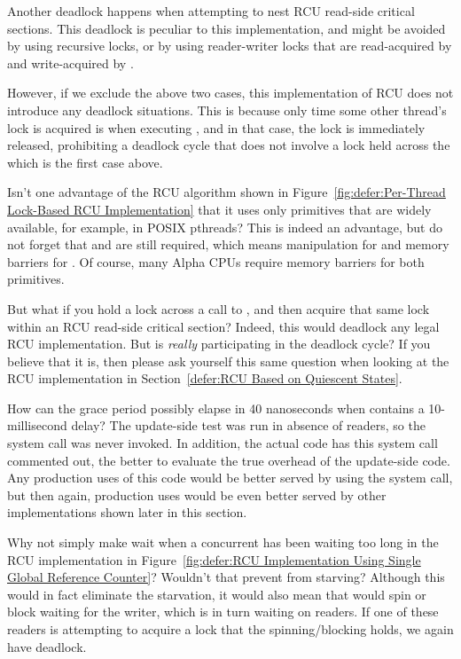 	Another deadlock happens when attempting to nest RCU read-side
	critical sections.
	This deadlock is peculiar to this implementation, and might
	be avoided by using recursive locks, or by using reader-writer
	locks that are read-acquired by  and
	write-acquired by .

	However, if we exclude the above two cases,
	this implementation of RCU does not introduce any deadlock
	situations.
	This is because only time some other thread's lock is acquired is when
	executing , and in that case, the lock
	is immediately released, prohibiting a deadlock cycle that
	does not involve a lock held across the 
	which is the first case above.

\QuickQ{}
	Isn't one advantage of the RCU algorithm shown in
	Figure~\ref{fig:defer:Per-Thread Lock-Based RCU Implementation}
	that it uses only primitives that are widely available,
	for example, in POSIX pthreads?
\QuickA{}
	This is indeed an advantage, but do not forget that
	 and 
	are still required, which means  manipulation
	for  and memory barriers for
	.
	Of course, many Alpha CPUs require memory barriers for both
	primitives.

\QuickQ{}
	But what if you hold a lock across a call to
	, and then acquire that same lock within
	an RCU read-side critical section?
\QuickA{}
	Indeed, this would deadlock any legal RCU implementation.
	But is  \emph{really} participating in
	the deadlock cycle?
	If you believe that it is, then please
	ask yourself this same question when looking at the
	RCU implementation in
	Section~\ref{defer:RCU Based on Quiescent States}.

\QuickQ{}
	How can the grace period possibly elapse in 40 nanoseconds when
	 contains a 10-millisecond delay?
\QuickA{}
	The update-side test was run in absence of readers, so the
	 system call was never invoked.
	In addition, the actual code has this 
	system call commented out, the better to evaluate the
	true overhead of the update-side code.
	Any production uses of this code would be better served by
	using the  system call, but then again,
	production uses would be even better served by other implementations
	shown later in this section.

\QuickQ{}
	Why not simply make  wait when a concurrent
	 has been waiting too long in
	the RCU implementation in
	Figure~\ref{fig:defer:RCU Implementation Using Single Global Reference Counter}?
	Wouldn't that prevent  from starving?
\QuickA{}
	Although this would in fact eliminate the starvation, it would
	also mean that  would spin or block waiting
	for the writer, which is in turn waiting on readers.
	If one of these readers is attempting to acquire a lock that
	the spinning/blocking  holds, we again
	have deadlock.

